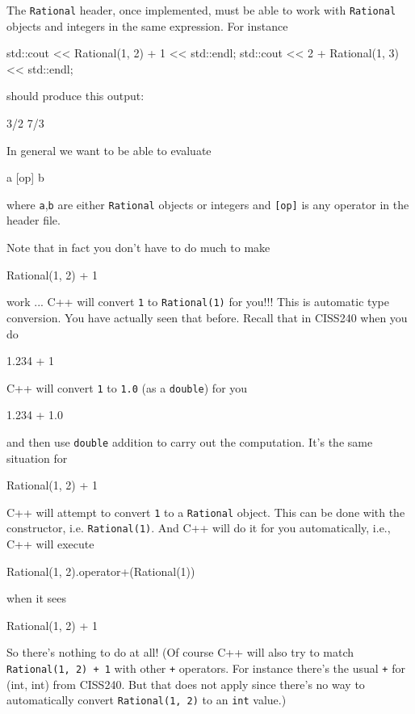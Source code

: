 The \texttt{Rational} header,
once implemented, must be able to work with
\texttt{Rational} objects and integers in the same expression.
For instance
\begin{console}
std::cout << Rational(1, 2) + 1 << std::endl;
std::cout << 2 + Rational(1, 3) << std::endl;
\end{console}
should produce this output:
\begin{console}
3/2
7/3
\end{console}
In general we want to be able to evaluate
\begin{console}
a [op] b
\end{console}
where \texttt{a},\texttt{b} are either \texttt{Rational} objects or
integers and \texttt{[op]} is any operator in the header file. 

Note that in fact you don't have to do much to make 
\begin{console}
Rational(1, 2) + 1
\end{console}
work ... C++ will convert \texttt{1} to \texttt{Rational(1)} for you!!!
This is automatic type conversion.
You have actually seen that before. Recall that in CISS240 when you do
\begin{console}
1.234 + 1
\end{console}
C++ will convert \texttt{1} to \texttt{1.0} (as a \texttt{double}) for you
\begin{console}
1.234 + 1.0
\end{console}
and then use \texttt{double} addition to carry out the computation.
It's the same situation for 	
\begin{console}
Rational(1, 2) + 1
\end{console}
C++ will attempt to convert \texttt{1} to a \texttt{Rational} object.
This can be done with the constructor, i.e. \texttt{Rational(1)}.
And C++ will do it for you automatically, i.e., C++ will execute
\begin{console}
Rational(1, 2).operator+(Rational(1))
\end{console}
when it sees
\begin{console}
Rational(1, 2) + 1
\end{console}

So there's nothing to do at all!
(Of course C++ will also try to match
\texttt{Rational(1, 2) + 1}
with other \texttt{+} operators.
For instance there's the usual \texttt{+} for (int, int)
from CISS240.
But that does not apply since there's no way to automatically convert
\texttt{Rational(1, 2)} to an \texttt{int} value.)

